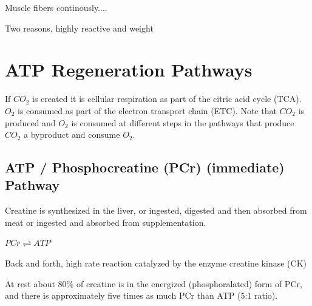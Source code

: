 Muscle fibers continously....

Two reasons, highly reactive and weight








\section{ATP Regeneration Pathways}

If $CO_2$ is created it is cellular respiration as part of the citric acid cycle (TCA). $O_2$ is consumed as part of the electron transport chain (ETC). Note that $CO_2$ is produced and $O_2$ is consumed at different steps in the pathways that produce $CO_2$ a byproduct and consume $O_2$.

\subsection{ATP / Phosphocreatine (PCr) (immediate) Pathway}


Creatine is synthesized in the liver, or ingested, digested and then absorbed from meat or ingested and absorbed from supplementation.\footnotemark{}

$PCr \rightleftharpoons ATP$

Back and forth, high rate reaction catalyzed by the enzyme creatine kinase (CK)

At rest about 80\% of creatine is in the energized (phosphoralated) form of PCr, and there is approximately five times as much PCr than ATP (5:1 ratio).

